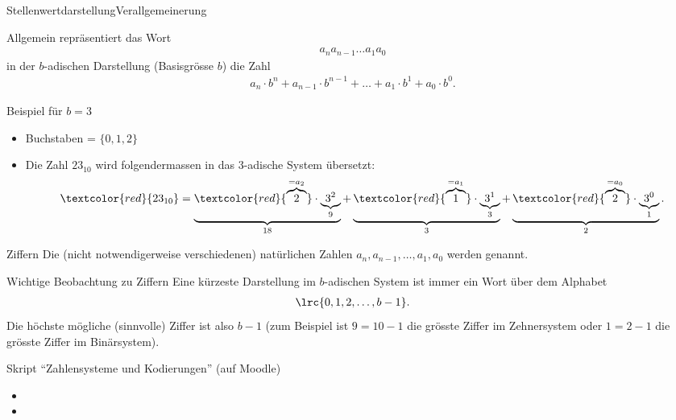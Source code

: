 \begin{frame}{Stellenwertdarstellung}{Verallgemeinerung}

Allgemein repräsentiert das Wort
    \begin{align*}
        a_na_{n-1}\ldots a_1a_0
    \end{align*}
    in der $b$-adischen Darstellung (Basisgrösse $b$) die Zahl
    \begin{align*}
        a_n\cdot b^n + a_{n-1}\cdot b^{n-1}+\ldots + a_1\cdot b^1 + a_0\cdot b^0.
    \end{align*}

    Beispiel für $b = 3$
    \begin{itemize}
        \item Buchstaben = $\{0,1,2\}$
        \item Die Zahl $23_{10}$ wird folgendermassen in das 3-adische System übersetzt:
        \begin{align*}
        \textcolor{red}{23_{10}}=\underbrace{\textcolor{red}{\overbrace{2}^{=a_2}}\cdot \underbrace{3^2}_{9}}_{18} + \underbrace{\textcolor{red}{\overbrace{1}^{=a_1}}\cdot \underbrace{3^1}_{3}}_{3} + \underbrace{\textcolor{red}{\overbrace{2}^{=a_0}}\cdot \underbrace{3^0}_{1}}_{2}.
    \end{align*}
    \end{itemize}
    
 \end{frame}

\begin{frame}{Ziffern}
Die (nicht notwendigerweise verschiedenen) natürlichen Zahlen $a_n,a_{n-1},\ldots,a_1,a_0$ werden  genannt.
\end{frame}

\begin{frame}{Wichtige Beobachtung zu Ziffern}
Eine kürzeste Darstellung im $b$-adischen System ist immer ein Wort über dem Alphabet
\begin{align*}
    \lrc{0,1,2,\ldots ,b-1}.
\end{align*}
Die höchste mögliche (sinnvolle) Ziffer ist also $b-1$ (zum Beispiel ist $9 = 10-1$ die grösste Ziffer im Zehnersystem oder $1 = 2-1$ die grösste Ziffer im Binärsystem).

\centering
\end{frame}

\begin{frame}{Skript ``Zahlensysteme und Kodierungen'' (auf Moodle)}
\begin{itemize}
    \item {}
    \item {}
\end{itemize}
\end{frame}


